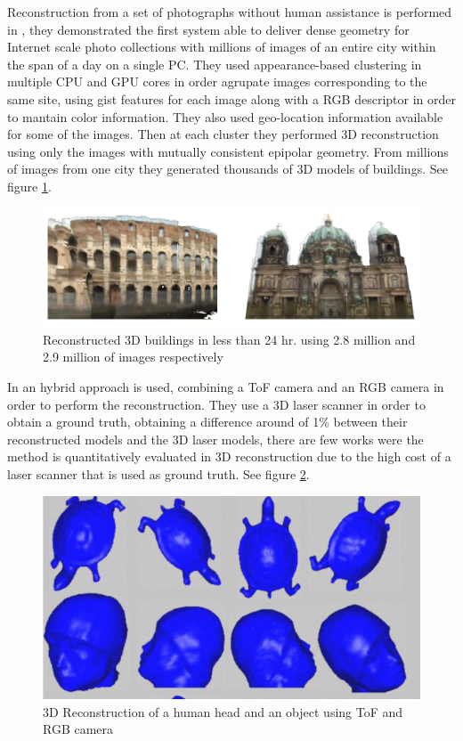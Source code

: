 
Reconstruction from a set of photographs without human assistance is performed in \cite{jan}, they demonstrated the first system able to deliver dense geometry for Internet scale photo collections with millions of images of an entire city within the span of a day on a single PC. They used appearance-based clustering in multiple CPU and GPU cores 
in order agrupate images corresponding to the same site, using gist features for each image along with a RGB
descriptor in order to mantain color information. They also used geo-location information available for some of 
the images. Then at each cluster they performed 3D reconstruction using only the images with mutually consistent epipolar 
geometry. From millions of images from one city they generated thousands of 3D models of buildings. See figure \ref{fig:jan}. 


\begin{figure}[h!]
\begin{center}
\includegraphics[scale=0.25]{images/jan}
\caption{Reconstructed 3D buildings in less than 24 hr. using 2.8 million and 2.9 million of images respectively}
\label{fig:jan}
\end{center}
\end{figure}


In \cite{guangyu} an hybrid approach is used, combining a ToF camera and an RGB camera in order to perform the reconstruction.
They use a 3D laser scanner in order to obtain a ground truth, obtaining a difference around of 1\% between their reconstructed
 models and the 3D laser models, there are few works were the method is quantitatively evaluated in 3D reconstruction due to the high 
cost of a laser scanner that is used as ground truth. See figure \ref{fig:guangyu}.


\begin{figure}[h!]
\begin{center}
\includegraphics[scale=0.38]{images/guangyu}
\caption{3D Reconstruction of a human head and an object using ToF and RGB camera}
\label{fig:guangyu}
\end{center}
\end{figure}

